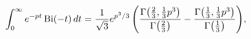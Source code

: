 \[\int_{0}^{\infty}e^{-pt}\mathop{\mathrm{Bi}\/}\nolimits\!\left(-t\right)dt={%
\frac{1}{\sqrt{3}}e^{p^{3}/3}\left(\frac{\mathop{\Gamma\/}\nolimits\!\left(%
\tfrac{2}{3},\tfrac{1}{3}p^{3}\right)}{\mathop{\Gamma\/}\nolimits\!\left(%
\tfrac{2}{3}\right)}-\frac{\mathop{\Gamma\/}\nolimits\!\left(\tfrac{1}{3},%
\tfrac{1}{3}p^{3}\right)}{\mathop{\Gamma\/}\nolimits\!\left(\tfrac{1}{3}\right%
)}\right)},\]